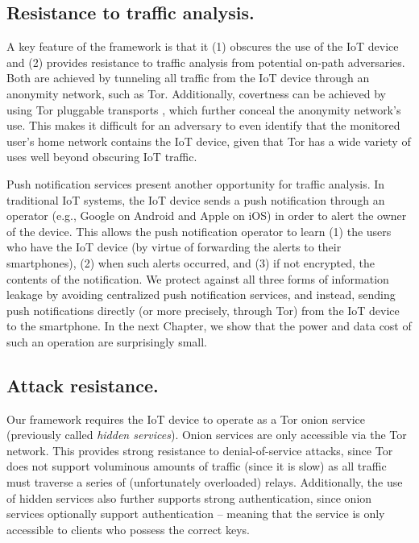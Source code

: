 \subsection{Resistance to traffic analysis.} A key feature of the framework is that it (1) obscures the use of the IoT device and (2) provides resistance to traffic analysis from potential on-path adversaries. Both are achieved by tunneling all traffic from the IoT device through an anonymity network, such as Tor. Additionally, covertness can be achieved by using Tor pluggable transports \cite{shahbar2015traffic}, which further conceal the anonymity network's use. This makes it difficult for an adversary to even identify that the monitored user's home network contains the IoT device, given that Tor has a wide variety of uses well beyond obscuring IoT traffic.

Push notification services present another opportunity for traffic analysis. In traditional IoT systems, the IoT device sends a push notification through an operator (e.g., Google on Android and Apple on iOS) in order to alert the owner of the device. This allows the push notification operator to learn (1) the users who have the IoT device (by virtue of forwarding the alerts to their smartphones), (2) when such alerts occurred, and (3) if not encrypted, the contents of the notification. We protect against all three forms of information leakage by avoiding centralized push notification services, and instead, sending push notifications directly (or more precisely, through Tor) from the IoT device to the smartphone. In the next Chapter, we show that the power and data cost of such an operation are surprisingly small.

\subsection{Attack resistance.} Our framework requires the IoT device to operate as a Tor onion service (previously called \textit{hidden services}). Onion services are only accessible via the Tor network. This provides strong resistance to denial-of-service attacks, since Tor does not support voluminous amounts of traffic (since it is slow) as all traffic must traverse a series of (unfortunately overloaded) relays. Additionally, the use of hidden services also further supports strong authentication, since onion services optionally support authentication -- meaning that the service is only accessible to clients who possess the correct keys.

